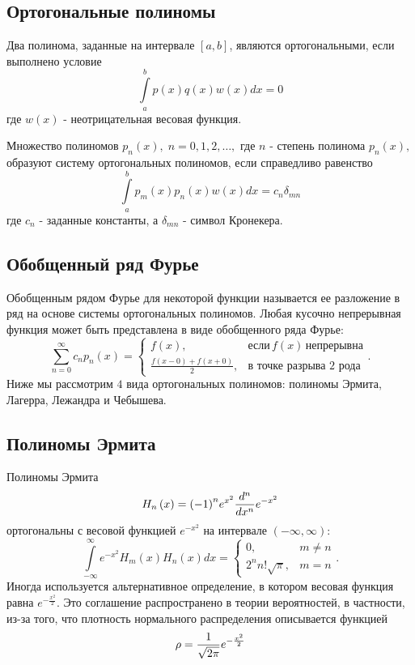 \subsection{Ортогональные полиномы}
 Два полинома, заданные на интервале $\left[ {a,b} \right]$, являются ортогональными, если выполнено условие 
 $$\int\limits_a^b {p\left( x \right)q\left( x \right)w\left( x \right)dx} = 0$$ 
 где ${w\left( x \right)}$ - неотрицательная весовая функция.

Множество полиномов ${p_n}\left( x \right),\;n = 0,1,2, \ldots ,$ где $n$ - степень полинома ${p_n}\left( x \right),$ образуют систему ортогональных полиномов, если справедливо равенство $$\int\limits_a^b {{p_m}\left( x \right){p_n}\left( x \right)w\left( x \right)dx} = {c_n}{\delta _{mn}}$$ где ${c_n}$ - заданные константы, а ${\delta _{mn}}$ - символ Кронекера.
\subsection{Обобщенный ряд Фурье}
Обобщенным рядом Фурье для некоторой функции называется ее разложение в ряд на основе системы ортогональных полиномов. Любая кусочно непрерывная функция может быть представлена в виде обобщенного ряда Фурье: $$ \sum\limits_{n = 0}^\infty {{c_n}{p_n}\left( x \right)} = \begin{cases} f\left( x \right), & \text{если}\,f\left( x \right)\,\text{непрерывна} \\ \frac{{f\left( {x - 0} \right) + f\left( {x + 0} \right)}}{2}, & \text{в точке разрыва 2 рода} \end{cases}. $$ Ниже мы рассмотрим $4$ вида ортогональных полиномов: полиномы Эрмита, Лагерра, Лежандра и Чебышева.
\subsection{Полиномы Эрмита}
Полиномы Эрмита $${H_n}\left( x \right) = {\left( { - 1} \right)^n}{e^{{x^2}}}\large\frac{{{d^n}}}{{d{x^n}}}\normalsize {e^{ - {x^2}}}$$ ортогональны с весовой функцией ${e^{ - {x^2}}}$ на интервале $\left( { - \infty ,\infty } \right):$ 
$$ \int\limits_{ - \infty }^\infty {{e^{ - {x^2}}}{H_m}\left( x \right){H_n}\left( x \right)dx} = \begin{cases} 0, & m \ne n \\ {2^n}n!\sqrt \pi, & m = n \end{cases}. $$
Иногда используется альтернативное определение, в котором весовая функция равна ${e^{ - \frac{{{x^2}}}{2}}}.$ Это соглашение распространено в теории вероятностей, в частности, из-за того, что плотность нормального распределения описывается функцией $$\rho=\large\frac{1}{{\sqrt {2\pi } }}\normalsize {e^{ - \frac{{{x^2}}}{2}}}$$
